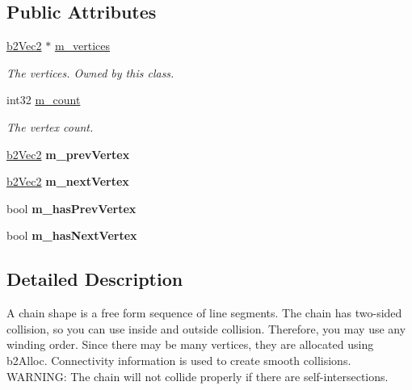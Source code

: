 \subsection*{Public Attributes}
\begin{DoxyCompactItemize}
\item 
\hypertarget{classb2_chain_shape_a481116a6886fb3880b13e55c966579da}{\hyperlink{structb2_vec2}{b2\-Vec2} $\ast$ \hyperlink{classb2_chain_shape_a481116a6886fb3880b13e55c966579da}{m\-\_\-vertices}}\label{classb2_chain_shape_a481116a6886fb3880b13e55c966579da}

\begin{DoxyCompactList}\small\item\em The vertices. Owned by this class. \end{DoxyCompactList}\item 
\hypertarget{classb2_chain_shape_ab2ad711781e6ac81179074e90e0e058b}{int32 \hyperlink{classb2_chain_shape_ab2ad711781e6ac81179074e90e0e058b}{m\-\_\-count}}\label{classb2_chain_shape_ab2ad711781e6ac81179074e90e0e058b}

\begin{DoxyCompactList}\small\item\em The vertex count. \end{DoxyCompactList}\item 
\hypertarget{classb2_chain_shape_a3a42d4c6b2421bc5badda3b6164949cf}{\hyperlink{structb2_vec2}{b2\-Vec2} {\bfseries m\-\_\-prev\-Vertex}}\label{classb2_chain_shape_a3a42d4c6b2421bc5badda3b6164949cf}

\item 
\hypertarget{classb2_chain_shape_af3716ef780dd5bcd905e350d8854aaa2}{\hyperlink{structb2_vec2}{b2\-Vec2} {\bfseries m\-\_\-next\-Vertex}}\label{classb2_chain_shape_af3716ef780dd5bcd905e350d8854aaa2}

\item 
\hypertarget{classb2_chain_shape_a8a6ffbb9de0e2b8545c8b4fc8aa77249}{bool {\bfseries m\-\_\-has\-Prev\-Vertex}}\label{classb2_chain_shape_a8a6ffbb9de0e2b8545c8b4fc8aa77249}

\item 
\hypertarget{classb2_chain_shape_a333b74486566e73c3cf1f7da5e69a96e}{bool {\bfseries m\-\_\-has\-Next\-Vertex}}\label{classb2_chain_shape_a333b74486566e73c3cf1f7da5e69a96e}

\end{DoxyCompactItemize}


\subsection{Detailed Description}
A chain shape is a free form sequence of line segments. The chain has two-\/sided collision, so you can use inside and outside collision. Therefore, you may use any winding order. Since there may be many vertices, they are allocated using b2\-Alloc. Connectivity information is used to create smooth collisions. W\-A\-R\-N\-I\-N\-G\-: The chain will not collide properly if there are self-\/intersections. 

